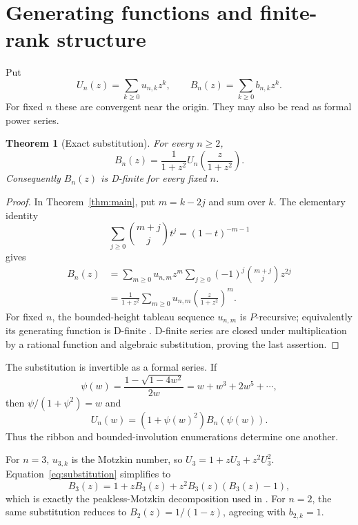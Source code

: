 \documentclass[11pt]{article}
\newtheorem{theorem}{Theorem}[section]
\theoremstyle{definition}
\begin{document}
\section{Generating functions and finite-rank structure}

Put
\[
 U_n(z)=\sum_{k\ge0}u_{n,k}z^k,
 \qquad B_n(z)=\sum_{k\ge0}b_{n,k}z^k.
\]
For fixed $n$ these are convergent near the origin.  They may also be read as
formal power series.

\begin{theorem}[Exact substitution]\label{thm:substitution}
For every $n\ge2$,
\begin{equation}\label{eq:substitution}
 B_n(z)=\frac{1}{1+z^2}
 U_n\!\left(\frac{z}{1+z^2}\right).
\end{equation}
Consequently $B_n(z)$ is D-finite for every fixed $n$.
\end{theorem}

\begin{proof}
In Theorem~\ref{thm:main}, put $m=k-2j$ and sum over $k$.  The elementary
identity
\[
 \sum_{j\ge0}\binom{m+j}{j}t^j=(1-t)^{-m-1}
\]
gives
\begin{align*}
 B_n(z)
 &=\sum_{m\ge0}u_{n,m}z^m
   \sum_{j\ge0}(-1)^j\binom{m+j}{j}z^{2j}\\
 &=\frac{1}{1+z^2}
   \sum_{m\ge0}u_{n,m}
   \left(\frac{z}{1+z^2}\right)^m.
\end{align*}
For fixed $n$, the bounded-height tableau sequence $u_{n,m}$ is
$P$-recursive; equivalently its generating function is D-finite
\cite{Gessel1990}.  D-finite series are closed under multiplication by a
rational function and algebraic substitution, proving the last assertion.
\end{proof}

The substitution is invertible as a formal series.  If
\[
 \psi(w)=\frac{1-\sqrt{1-4w^2}}{2w}=w+w^3+2w^5+\cdots,
\]
then $\psi/(1+\psi^2)=w$ and
\begin{equation}\label{eq:inverse-substitution}
 U_n(w)=(1+\psi(w)^2)B_n(\psi(w)).
\end{equation}
Thus the ribbon and bounded-involution enumerations determine one another.

For $n=3$, $u_{3,k}$ is the Motzkin number, so
$U_3=1+zU_3+z^2U_3^2$.  Equation~\eqref{eq:substitution} simplifies to
\[
 B_3(z)=1+zB_3(z)+z^2B_3(z)(B_3(z)-1),
\]
which is exactly the peakless-Motzkin decomposition used in
\cite{Tenn2026}.  For $n=2$, the same substitution reduces to
$B_2(z)=1/(1-z)$, agreeing with $b_{2,k}=1$.
\end{document}
